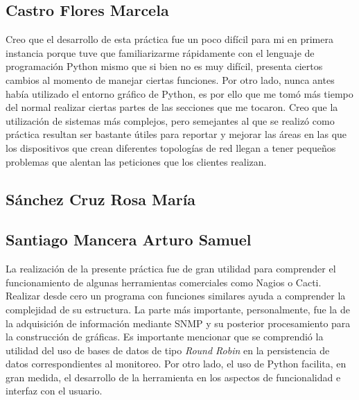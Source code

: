 \subsection{Castro Flores Marcela}
Creo que el desarrollo de esta práctica fue un poco difícil para mi en primera instancia porque tuve que familiarizarme rápidamente con el lenguaje de programación Python mismo que si bien no es muy difícil, presenta ciertos cambios al momento de manejar ciertas funciones. Por otro lado, nunca antes había utilizado el entorno gráfico de Python, es por ello que me tomó más tiempo del normal realizar ciertas partes de las secciones que me tocaron. 
Creo que la utilización de sistemas más complejos, pero semejantes al que se realizó como práctica resultan ser bastante útiles para reportar y mejorar las áreas en las que los dispositivos que crean diferentes topologías de red llegan a tener pequeños problemas que alentan las peticiones que los clientes realizan. 
\subsection{Sánchez Cruz Rosa María}
\subsection{Santiago Mancera Arturo Samuel}
La realización de la presente práctica fue de gran utilidad para comprender el funcionamiento de algunas herramientas comerciales como Nagios o Cacti. Realizar desde cero un programa con funciones similares ayuda a comprender la complejidad de su estructura.
La parte más importante, personalmente, fue la de la adquisición de información mediante SNMP y su posterior procesamiento para la construcción de gráficas. Es importante mencionar que se comprendió la utilidad del uso de bases de datos de tipo \textit{Round Robin} en la persistencia de datos correspondientes al monitoreo.
Por otro lado, el uso de Python facilita, en gran medida, el desarrollo de la herramienta en los aspectos de funcionalidad e interfaz con el usuario.